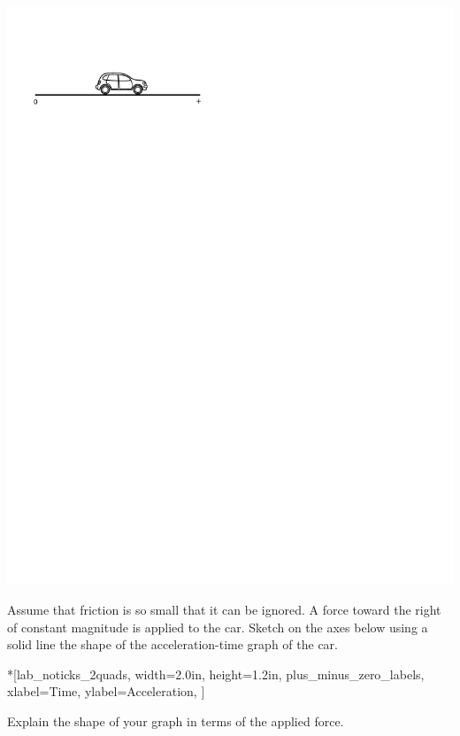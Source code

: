 \vspace{0.3cm}
{\par\centering \includegraphics{force2/car_on_ground_pm.pdf} \par}
\vspace{0.3cm}

Assume that friction is so small that it can be ignored. A force toward the
right of constant magnitude is applied to the car. Sketch on the axes below
using a solid line the shape of the acceleration-time graph of the car.

\begin{lab_axis}*[lab_noticks_2quads,
	width=2.0in,  height=1.2in,
	plus_minus_zero_labels,
	xlabel=Time,
	ylabel=Acceleration,
	]
\end{lab_axis}

Explain the shape of your graph in terms of the applied force.

